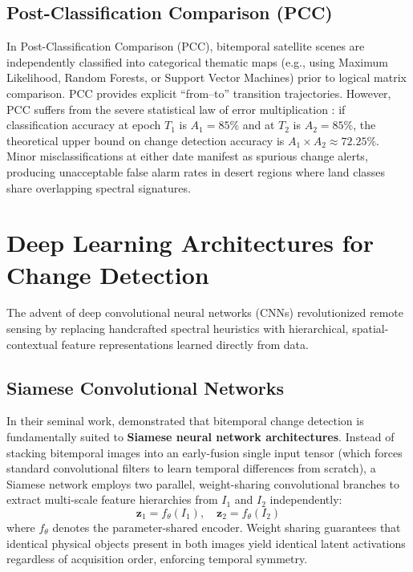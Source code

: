 \subsection{Post-Classification Comparison (PCC)}
In Post-Classification Comparison (PCC), bitemporal satellite scenes are independently classified into categorical thematic maps (e.g., using Maximum Likelihood, Random Forests, or Support Vector Machines) prior to logical matrix comparison. PCC provides explicit ``from--to'' transition trajectories. However, PCC suffers from the severe statistical law of error multiplication \citep{congalton1991review, foody2002status}: if classification accuracy at epoch $T_1$ is $A_1 = 85\%$ and at $T_2$ is $A_2 = 85\%$, the theoretical upper bound on change detection accuracy is $A_1 \times A_2 \approx 72.25\%$. Minor misclassifications at either date manifest as spurious change alerts, producing unacceptable false alarm rates in desert regions where land classes share overlapping spectral signatures.

\section{Deep Learning Architectures for Change Detection}
\label{sec:lit_deep_learning}
The advent of deep convolutional neural networks (CNNs) revolutionized remote sensing by replacing handcrafted spectral heuristics with hierarchical, spatial-contextual feature representations learned directly from data.

\subsection{Siamese Convolutional Networks}
In their seminal work, \citet{daudt2018fully} demonstrated that bitemporal change detection is fundamentally suited to \textbf{Siamese neural network architectures}. Instead of stacking bitemporal images into an early-fusion single input tensor (which forces standard convolutional filters to learn temporal differences from scratch), a Siamese network employs two parallel, weight-sharing convolutional branches to extract multi-scale feature hierarchies from $I_1$ and $I_2$ independently:
\begin{equation}
    \mathbf{z}_1 = f_\theta(I_1), \quad \mathbf{z}_2 = f_\theta(I_2)
    \label{eq:siamese_encoding}
\end{equation}
where $f_\theta$ denotes the parameter-shared encoder. Weight sharing guarantees that identical physical objects present in both images yield identical latent activations regardless of acquisition order, enforcing temporal symmetry.

